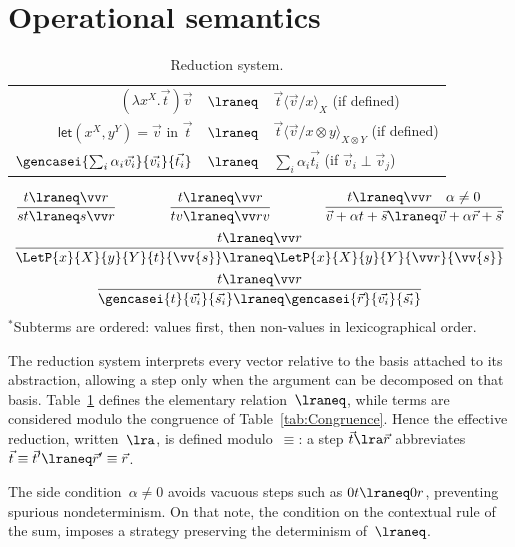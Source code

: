 \section{Operational semantics}\label{sec:reduction}
\begin{table}[t]
  \centering
  \begin{tabular}{r@{~}c@{~}l}
    $(\lambda x^X.\vec{t})\vec{v}$ & $\lraneq$ & $\vec{t}\langle\vec{v}/x\rangle_X$ \hfill (if defined) \\
    $\mathsf{let} (x^X, y^Y) = \vec{v} \text{ in } \vec{t}$ & $\lraneq$ & $\vec{t}\langle\vec{v}/x \otimes y\rangle_{X \otimes Y}$ \hfill (if defined) \\
    $\gencasei{\sum_{i}\alpha_i \vec{v_i}}{\vec{v_i}}{\vec{t_i}}$ & $\lraneq$ & $\sum_{i}\alpha_i \vec{t_i}$ \hfill (if $\vec{v}_i \perp \vec{v}_j$) \\
  \end{tabular}
  \[
    \begin{array}{c}
      \infer{st\lraneq s\vv r}{t\lraneq \vv r}
      \qquad\qquad
      \infer{tv\lraneq \vv rv}{t\lraneq\vv r}
      \qquad\qquad
      \infer{\vec v+\alpha t+\vec s \lraneq \vec v+\alpha \vec r+\vec s}{t\lraneq\vv r & \alpha\neq 0}
      \\[5pt]
      \infer{\LetP{x}{X}{y}{Y}{t}{\vv{s}}\lraneq
      \LetP{x}{X}{y}{Y}{\vv r}{\vv{s}}}{t\lraneq \vv r} 
      \\[5pt]
      \infer{
        \gencasei{t}{\vec{v_i}}{\vec{s_i}} \lraneq 
        \gencasei{\vec r}{\vec{v_i}}{\vec{s_i}}}
      {t\lraneq \vv r}
    \end{array}
  \]
  \noindent\footnotesize $^*$Subterms are ordered: values first, then non-values in lexicographical order.
  \caption{Reduction system.}
  \label{tab:Reduction}
\end{table}
The reduction system interprets every vector relative to the basis attached to
its abstraction, allowing a step only when the argument can be decomposed on
that basis.  
Table~\ref{tab:Reduction} defines the elementary relation~$\lraneq$, while terms are
considered modulo the congruence of Table~\ref{tab:Congruence}.  
Hence the effective reduction, written~$\lra$, is defined modulo~$\equiv$:
a step $\vec t\lra\vec r$ abbreviates $\vec t\equiv\vec t'\lraneq\vec r'\equiv\vec r$.

The side condition~$\alpha\neq0$ avoids vacuous steps such as
$0t\lraneq0r$, preventing spurious nondeterminism. On that note,
the condition on the contextual rule of the sum, imposes a strategy
preserving the determinism of~$\lraneq$.

